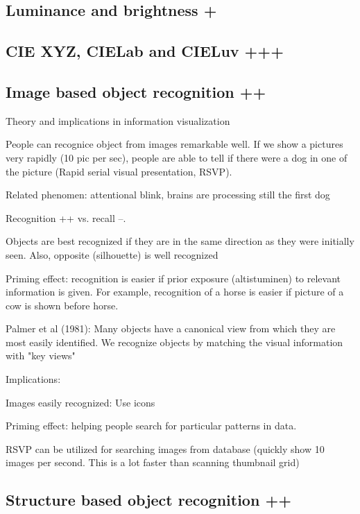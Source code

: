 \documentclass[a4paper]{article}
\begin{document}
\subsection{Luminance and brightness +}

\subsection{CIE XYZ, CIELab and CIELuv +++}

\subsection{Image based object recognition ++}

Theory and implications in information visualization

People can recognice object from images remarkable well. If we show a pictures very rapidly (10 pic per sec), people are able to tell if there were a dog in one of the picture (Rapid serial visual presentation, RSVP).

Related phenomen: attentional blink, brains are processing still the first dog

Recognition ++ vs. recall --.

Objects are best recognized if they are in the same direction as they were initially seen. Also, opposite (silhouette) is well recognized

Priming effect: recognition is easier if prior exposure (altistuminen) to relevant information is given. For example, recognition of a horse is easier if picture of a cow is shown before horse.

Palmer et al (1981): Many objects have a canonical view from which they are most easily identified. We recognize objects by matching the visual information with "key views"

Implications:

Images easily recognized: Use icons

Priming effect: helping people search for particular patterns in data.

RSVP can be utilized for searching images from database (quickly show 10 images per second. This is a lot faster than scanning thumbnail grid)



\subsection{Structure based object recognition ++}
\end{document}
